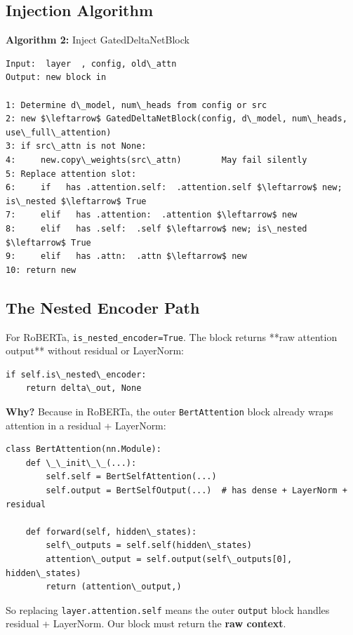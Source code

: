 \subsection{Injection Algorithm}

\textbf{Algorithm 2:} Inject GatedDeltaNetBlock
\begin{lstlisting}
Input:  layer  , config, old\_attn
Output: new block in  

1: Determine d\_model, num\_heads from config or src
2: new $\leftarrow$ GatedDeltaNetBlock(config, d\_model, num\_heads, use\_full\_attention)
3: if src\_attn is not None:
4:     new.copy\_weights(src\_attn)        May fail silently
5: Replace attention slot:
6:     if   has .attention.self:  .attention.self $\leftarrow$ new; is\_nested $\leftarrow$ True
7:     elif   has .attention:  .attention $\leftarrow$ new
8:     elif   has .self:  .self $\leftarrow$ new; is\_nested $\leftarrow$ True
9:     elif   has .attn:  .attn $\leftarrow$ new
10: return new
\end{lstlisting}

\subsection{The Nested Encoder Path}

For RoBERTa, \texttt{is\_nested\_encoder=True}. The block returns **raw attention 
output** without residual or LayerNorm:

\begin{lstlisting}
if self.is\_nested\_encoder:
    return delta\_out, None
\end{lstlisting}

\textbf{Why?} Because in RoBERTa, the outer \texttt{BertAttention} block already wraps 
attention in a residual + LayerNorm:

\begin{lstlisting}
class BertAttention(nn.Module):
    def \_\_init\_\_(...):
        self.self = BertSelfAttention(...)
        self.output = BertSelfOutput(...)  # has dense + LayerNorm + residual
    
    def forward(self, hidden\_states):
        self\_outputs = self.self(hidden\_states)
        attention\_output = self.output(self\_outputs[0], hidden\_states)
        return (attention\_output,)
\end{lstlisting}

So replacing \texttt{layer.attention.self} means the outer \texttt{output} block handles 
residual + LayerNorm. Our block must return the \textbf{raw context}.

